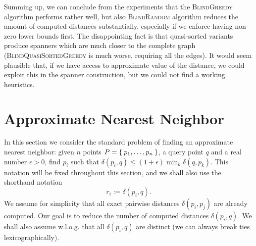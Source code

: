 \documentclass[a4paper,USenglish]{socg-lipics-v2018}
\newcommand{\eps}{\epsilon}
\newcommand{\dist}{\delta}
\begin{document}
Summing up, we can conclude from the experiments that 
 the \textsc{BlindGreedy} algorithm performs rather well, but also \textsc{BlindRandom}
algorithm reduces the amount of computed distances substantially, especially if we enforce having non-zero lower bounds
first. The disappointing fact is that quasi-sorted variants produce spanners which are much closer to the complete graph
(\textsc{BlindQuasiSortedGreedy} is much worse, requiring all the edges). It would seem plausible that, if we have
access to approximate value of the distance, we could exploit this in the spanner construction, but we could not
find a working heuristics.




\section{Approximate Nearest Neighbor}

In this section we consider the standard problem of finding an approximate nearest neighbor: given
$n$ points $P = \Set{p_1, \dots, p_n}$, a query point $q$ and a real number $\eps > 0$,
find $p_i$ such that $\dist(p_i, q) \leq (1 + \eps) \min_{k} \dist(q, p_k)$. This notation will be fixed throughout this 
section, and we shall also use the shorthand notation
\[
    r_i := \dist(p_i, q).
\]
We assume for simplicity
that all exact pairwise distances $\dist(p_i, p_j)$ are already computed.
Our goal is to reduce the number of computed distances $\dist(p_i, q)$. We shall also assume w.l.o.g.
that all $\dist(p_i, q)$ are distinct (we can always break ties lexicographically).
\end{document}

